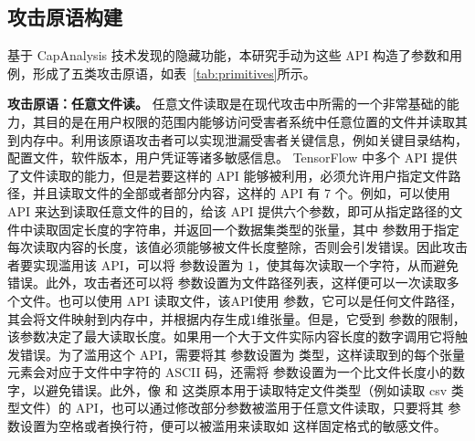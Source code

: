\subsection{攻击原语构建}
基于 CapAnalysis 技术发现的隐藏功能，本研究手动为这些 API 构造了参数和用例，形成了五类攻击原语，如表~\ref{tab:primitives}所示。

\textbf{攻击原语：任意文件读。}
任意文件读取是在现代攻击中所需的一个非常基础的能力，其目的是在用户权限的范围内能够访问受害者系统中任意位置的文件并读取其到内存中。利用该原语攻击者可以实现泄漏受害者关键信息，例如关键目录结构，配置文件，软件版本，用户凭证等诸多敏感信息。 TensorFlow 中多个 API 提供了文件读取的能力，但是若要这样的 API 能够被利用，必须允许用户指定文件路径，并且读取文件的全部或者部分内容，这样的 API 有 7 个。例如，可以使用  API 来达到读取任意文件的目的，给该 API 提供六个参数，即可从指定路径的文件中读取固定长度的字符串，并返回一个数据集类型的张量，其中  参数用于指定每次读取内容的长度，该值必须能够被文件长度整除，否则会引发错误。因此攻击者要实现滥用该 API，可以将  参数设置为 1，使其每次读取一个字符，从而避免错误。此外，攻击者还可以将  参数设置为文件路径列表，这样便可以一次读取多个文件。也可以使用  API 读取文件，该API使用  参数，它可以是任何文件路径，其会将文件映射到内存中，并根据内存生成1维张量。但是，它受到  参数的限制，该参数决定了最大读取长度。如果用一个大于文件实际内容长度的数字调用它将触发错误。为了滥用这个 API，需要将其  参数设置为  类型，这样读取到的每个张量元素会对应于文件中字符的 ASCII 码，还需将  参数设置为一个比文件长度小的数字，以避免错误。此外，像  和  这类原本用于读取特定文件类型（例如读取 csv 类型文件）的 API，也可以通过修改部分参数被滥用于任意文件读取，只要将其  参数设置为空格或者换行符，便可以被滥用来读取如  这样固定格式的敏感文件。

